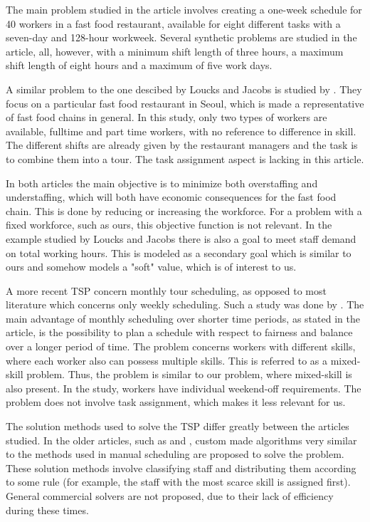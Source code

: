 The main problem studied in the article involves creating a one-week schedule for 40 workers in a fast food restaurant, available for eight different tasks with a seven-day and 128-hour workweek. Several synthetic problems are studied in the article, all, however, with a minimum shift length of three hours, a maximum shift length of eight hours and a maximum of five work days.

A similar problem to the one descibed by Loucks and Jacobs is studied by \citet{choi_hwang_park_2009}. They focus on a particular fast food restaurant in Seoul, which is made a representative of fast food chains in general. In this study, only two types of workers are available, fulltime and part time workers, with no reference to difference in skill. The different shifts are already given by the restaurant managers and the task is to combine them into a tour. The task assignment aspect is lacking in this article.


In both articles the main objective is to minimize both overstaffing and understaffing, which will both have economic consequences for the fast food chain. This is done by reducing or increasing the workforce. For a problem with a fixed workforce, such as ours, this objective function is not relevant. In the example studied by Loucks and Jacobs there is also a goal to meet staff demand on total working hours. This is modeled as a secondary goal which is similar to ours and somehow models a "soft" value, which is of interest to us.

A more recent TSP concern monthly tour scheduling, as opposed to most literature which concerns only weekly scheduling. Such a study was done by \citet{rong_2010}. The main advantage of monthly scheduling over shorter time periods, as stated in the article, is the possibility to plan a schedule with respect to fairness and balance over a longer period of time. The problem concerns workers with different skills, where each worker also can possess multiple skills. This is referred to as a mixed-skill problem. Thus, the problem is similar to our problem, where mixed-skill is also present. In the study, workers have individual weekend-off requirements. The problem does not involve task assignment, which makes it less relevant for us.

The solution methods used to solve the TSP differ greatly between the articles studied. In the older articles, such as \citet{thompson_1988} and \citet{loucks_1991}, custom made algorithms very similar to the methods used in manual scheduling are proposed to solve the problem. These solution methods involve classifying staff and distributing them according to some rule (for example, the staff with the most scarce skill is assigned first). General commercial solvers are not proposed, due to their lack of efficiency during these times. 

